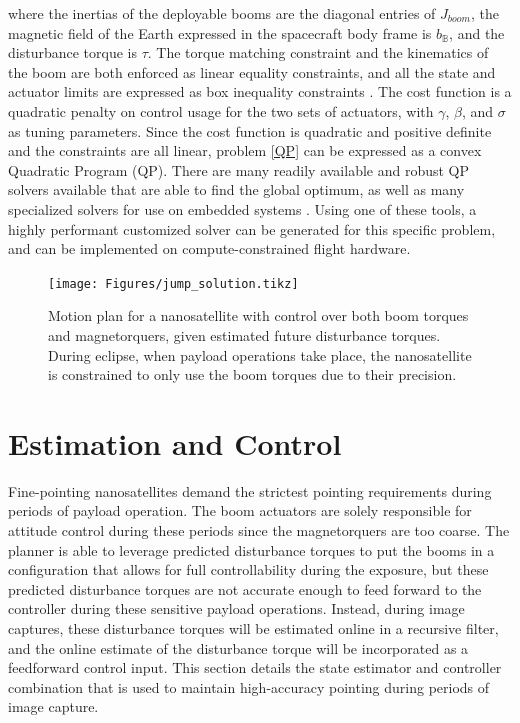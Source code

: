 where the inertias of the deployable booms are the diagonal entries of $J_{boom}$, the magnetic field of the Earth expressed in the spacecraft body frame is $b_{\mathbb{B}}$, and the disturbance torque is $\tau$. The torque matching constraint and the kinematics of the boom are both enforced as linear equality constraints, and all the state and actuator limits are expressed as box inequality constraints \cite{stellato}. The cost function is a quadratic penalty on control usage for the two sets of actuators, with $\gamma$, $\beta$, and $\sigma$ as tuning parameters. Since the cost function is quadratic and positive definite and the constraints are all linear, problem \ref{QP} can be expressed as a convex Quadratic Program (QP).  There are many readily available and robust QP solvers available that are able to find the global optimum, as well as many specialized solvers for use on embedded systems \cite{mattingley2012,stellato,banjac2017}.  Using one of these tools, a highly performant customized solver can be generated for this specific problem, and can be implemented on compute-constrained flight hardware.
\begin{figure}
\centering
\texttt{[image: Figures/jump\_solution.tikz]}
\caption{Motion plan for a nanosatellite with control over both boom torques and magnetorquers, given estimated future disturbance torques. During eclipse, when payload operations take place, the nanosatellite is constrained to only use the boom torques due to their precision.}
\label{fig:jumpsolution}
\end{figure}
\section{Estimation and Control}
\label{sec:wigglesat:control}
Fine-pointing nanosatellites demand the strictest pointing requirements during periods of payload operation. The boom actuators are solely responsible for attitude control during these periods since the magnetorquers are too coarse. The planner is able to leverage predicted disturbance torques to put the booms in a configuration that allows for full controllability during the exposure, but these predicted disturbance torques are not accurate enough to feed forward to the controller during these sensitive payload operations. Instead, during image captures, these disturbance torques will be estimated online in a recursive filter, and the online estimate of the disturbance torque will be incorporated as a feedforward control input. This section details the state estimator and controller combination that is used to maintain high-accuracy pointing during periods of image capture.
